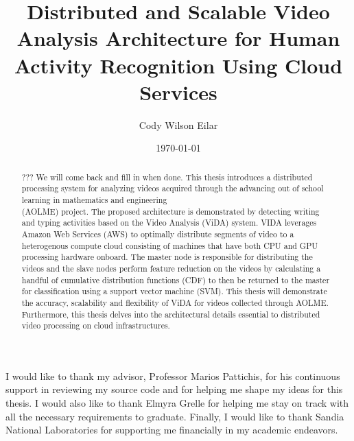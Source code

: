 \documentclass[botnum, fleqn, final]{unmeethesis}
\begin{document}
  \frontmatter



  \title{Distributed and Scalable Video Analysis Architecture
  for Human Activity Recognition Using Cloud Services}

  \author{Cody Wilson Eilar}
  \date{\monthyeardate\today}

  \maketitle



  \begin{acknowledgments}
    \vspace{1.1in}
    I would like to thank my advisor, Professor Marios Pattichis, for his
    continuous support in reviewing my source code and for helping me shape my
    ideas for this thesis. I would also like to thank Elmyra Grelle for helping
    me stay on track with all the necessary requirements to graduate. Finally, I
    would like to thank Sandia National Laboratories for supporting me
    financially in my academic endeavors.
  \end{acknowledgments}

  \maketitleabstract %

  \begin{abstract}
  \color{red}
  ??? We will come back and fill in when done.
  \color{black}
    This thesis introduces a distributed processing system for analyzing videos
    acquired through the advancing out of school learning in mathematics and
    engineering \\ (AOLME)
     project. The proposed architecture is demonstrated by
    detecting writing and typing activities based on the Video Analysis (ViDA)
    system. VIDA leverages Amazon Web Services (AWS) to optimally distribute
    segments of video to a heterogenous compute cloud consisting of machines
    that have both CPU and GPU processing hardware onboard. The master node is
    responsible for distributing the videos and the slave nodes perform feature
    reduction on the videos by calculating a handful of cumulative distribution
    functions (CDF) to then be returned to the master for classification using a
    support vector machine (SVM). This thesis will demonstrate the accuracy,
    scalability and flexibility of ViDA for videos collected through AOLME.
    Furthermore, this thesis delves into the architectural details essential to
    distributed video processing on cloud infrastructures.

    \clearpage %
  \end{abstract}
\end{document}
